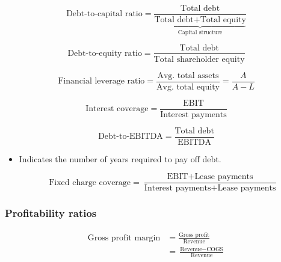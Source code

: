 \documentclass[../notes_compiled.tex]{subfiles}
\begin{document}
\begin{equation*}
\text{Debt-to-capital ratio} = \frac{\text{Total debt}}{\underbrace{\text{Total debt} + \text{Total equity}}_{\text{Capital structure}}}
\end{equation*}

\begin{equation*}
\text{Debt-to-equity ratio} = \frac{\text{Total debt}}{\text{Total shareholder equity}}
\end{equation*}

\begin{equation*}
\text{Financial leverage ratio} = \frac{\text{Avg. total assets}}{\text{Avg. total equity}} = \frac{A}{A-L}
\end{equation*}

\begin{equation*}
\text{Interest coverage} = \frac{\text{EBIT}}{\text{Interest payments}}
\end{equation*}

\begin{equation*}
\text{Debt-to-EBITDA} = \frac{\text{Total debt}}{\text{EBITDA}}
\end{equation*}
\begin{itemize}
\item Indicates the number of years required to pay off debt.

\begin{equation*}
\text{Fixed charge coverage} = \frac{\text{EBIT}+\text{Lease payments}}{\text{Interest payments}+\text{Lease payments}}
\end{equation*}

\end{itemize}

\subsubsection{Profitability ratios}

\begin{align*}
\text{Gross profit margin} &= \frac{\text{Gross profit}}{\text{Revenue}} \\
&=\frac{\text{Revenue}-\text{COGS}}{\text{Revenue}}
\end{align*}
\end{document}
